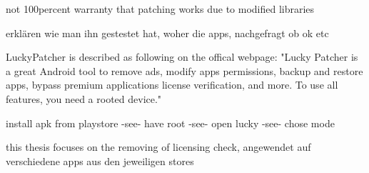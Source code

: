 not 100percent warranty that patching works due to modified libraries


erklären wie man ihn gestestet hat, woher die apps, nachgefragt ob ok etc

LuckyPatcher is described as following on the offical webpage: "Lucky Patcher is a great Android tool to remove ads, modify apps permissions, backup and restore apps, bypass premium applications license verification, and more. To use all features, you need a rooted device." \cite{luckyPatcherOfficial}

install apk from playstore -see- have root -see- open lucky -see- chose mode


this thesis focuses on the removing of licensing check, angewendet auf verschiedene apps aus den jeweiligen stores
